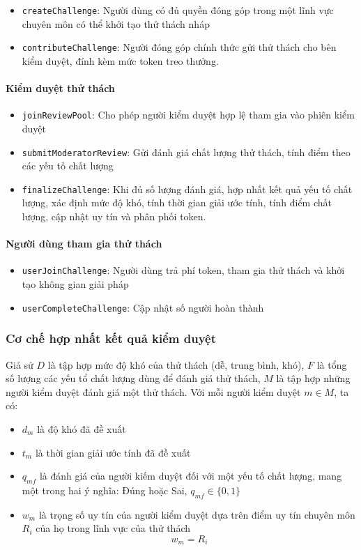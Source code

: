 \begin{itemize}
  \item \texttt{createChallenge}: Người dùng có đủ quyền đóng góp trong một lĩnh vực chuyên môn có thể khởi tạo thử thách nháp
  \item \texttt{contributeChallenge}: Người đóng góp chính thức gửi thử thách cho bên kiểm duyệt, đính kèm mức token treo thưởng.
\end{itemize}

\paragraph{Kiểm duyệt thử thách}

\begin{itemize}
  \item \texttt{joinReviewPool}: Cho phép người kiểm duyệt hợp lệ tham gia vào phiên kiểm duyệt
  \item \texttt{submitModeratorReview}: Gửi đánh giá chất lượng thử thách, tính điểm theo các yếu tố chất lượng
  \item \texttt{finalizeChallenge}: Khi đủ số lượng đánh giá, hợp nhất kết quả yếu tố chất lượng, xác định mức độ khó, tính thời gian giải ước tính, tính điểm chất lượng, cập nhật uy tín và phân phối token.
\end{itemize}

\paragraph{Người dùng tham gia thử thách}

\begin{itemize}
  \item \texttt{userJoinChallenge}: Người dùng trả phí token, tham gia thử thách và khởi tạo không gian giải pháp
  \item \texttt{userCompleteChallenge}: Cập nhật số người hoàn thành
\end{itemize}

\subsubsection{Cơ chế hợp nhất kết quả kiểm duyệt}

Giả sử $D$ là tập hợp mức độ khó của thử thách (dễ, trung bình, khó), $F$ là tổng số lượng các yếu tổ chất lượng dùng để đánh giá thử thách, $M$ là tập hợp những người kiểm duyệt đánh giá một thử thách. Với mỗi người kiểm duyệt $m \in M$, ta có:
\begin{itemize}
  \item $d_m$ là độ khó đã đề xuất
  \item $t_m$ là thời gian giải ước tính đã đề xuất
  \item $q_{mf}$ là đánh giá của người kiếm duyệt đối với một yếu tố chất lượng, mang một trong hai ý nghĩa: Đúng hoặc Sai, $q_{mf} \in \{0,1\}$
  \item $w_m$ là trọng số uy tín của người kiểm duyệt dựa trên điểm uy tín chuyên môn $R_{i}$ của họ trong lĩnh vực của thử thách
  \[w_m = R_{i}\]
\end{itemize}

